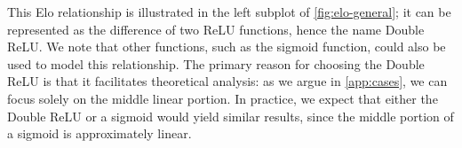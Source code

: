 \documentclass{article}
\begin{document}
This Elo relationship is illustrated in the left subplot of \cref{fig:elo-general}; it can be represented as the difference of two ReLU functions, hence the name Double ReLU. We note that other functions, such as the sigmoid function, could also be used to model this relationship. The primary reason for choosing the Double ReLU is that it facilitates theoretical analysis: as we argue in \cref{app:cases}, we can focus solely on the middle linear portion. In practice, we expect that either the Double ReLU or a sigmoid would yield similar results, since the middle portion of a sigmoid is approximately linear.



\end{document}
